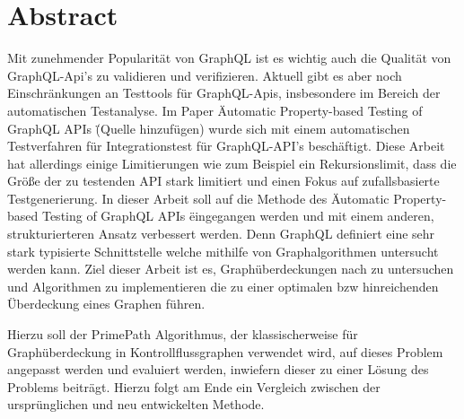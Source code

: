 \chapter{Abstract}

Mit zunehmender Popularität von GraphQL ist es wichtig auch die Qualität von GraphQL-Api's zu validieren und verifizieren.
Aktuell gibt es aber noch Einschränkungen an Testtools für GraphQL-Apis, insbesondere im Bereich der automatischen Testanalyse.
Im Paper \" Automatic Property-based Testing of GraphQL APIs \" (Quelle hinzufügen) wurde sich mit einem automatischen
Testverfahren für Integrationstest für GraphQL-API's beschäftigt.
Diese Arbeit hat allerdings einige Limitierungen wie zum Beispiel ein Rekursionslimit, dass die Größe der zu testenden
API stark limitiert und einen Fokus auf zufallsbasierte Testgenerierung.
In dieser Arbeit soll auf die Methode des \" Automatic Property-based Testing of GraphQL APIs \"
eingegangen werden und mit einem anderen, strukturierteren Ansatz verbessert werden.
Denn GraphQL definiert eine sehr stark typisierte Schnittstelle welche mithilfe von Graphalgorithmen untersucht werden kann.
Ziel dieser Arbeit ist es, Graphüberdeckungen nach \cite{software-testing} zu untersuchen und Algorithmen zu implementieren
die zu einer optimalen bzw hinreichenden Überdeckung eines Graphen führen.

Hierzu soll der PrimePath Algorithmus, der klassischerweise für Graphüberdeckung in Kontrollflussgraphen verwendet wird, auf
dieses Problem angepasst werden und evaluiert werden, inwiefern dieser zu einer Lösung des Problems beiträgt.
Hierzu folgt am Ende ein Vergleich zwischen der ursprünglichen und neu entwickelten Methode.


